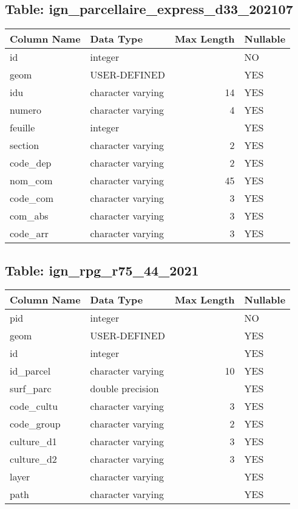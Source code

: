 \subsection*{Table: ign_parcellaire_express_d33_202107}
\begin{tabular}{llrl}
\hline
 Column Name   & Data Type         &   Max Length & Nullable   \\
\hline
 id            & integer           &              & NO         \\
 geom          & USER-DEFINED      &              & YES        \\
 idu           & character varying &           14 & YES        \\
 numero        & character varying &            4 & YES        \\
 feuille       & integer           &              & YES        \\
 section       & character varying &            2 & YES        \\
 code_dep      & character varying &            2 & YES        \\
 nom_com       & character varying &           45 & YES        \\
 code_com      & character varying &            3 & YES        \\
 com_abs       & character varying &            3 & YES        \\
 code_arr      & character varying &            3 & YES        \\
\hline
\end{tabular}
\subsection*{Table: ign_rpg_r75_44_2021}
\begin{tabular}{llrl}
\hline
 Column Name   & Data Type         &   Max Length & Nullable   \\
\hline
 pid           & integer           &              & NO         \\
 geom          & USER-DEFINED      &              & YES        \\
 id            & integer           &              & YES        \\
 id_parcel     & character varying &           10 & YES        \\
 surf_parc     & double precision  &              & YES        \\
 code_cultu    & character varying &            3 & YES        \\
 code_group    & character varying &            2 & YES        \\
 culture_d1    & character varying &            3 & YES        \\
 culture_d2    & character varying &            3 & YES        \\
 layer         & character varying &              & YES        \\
 path          & character varying &              & YES        \\
\hline
\end{tabular}
